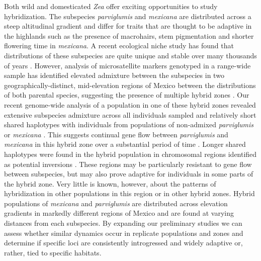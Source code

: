  	 
Both wild and domesticated \emph{Zea} offer exciting opportunities to study hybridization. 
The subspecies \emph{parviglumis} and \emph{mexicana} are distributed across a steep altitudinal gradient and differ for traits that are thought to be adaptive in the highlands such as the presence of macrohairs, stem pigmentation and shorter flowering time in \emph{mexicana}.
A recent ecological niche study has found that distributions of these subspecies are quite unique and stable over many thousands of years \citep{hufford2012inferences}.
However, analysis of microsatellite markers genotyped in a range-wide sample has identified elevated admixture between the subspecies in two geographically-distinct, mid-elevation regions of Mexico between the distributions of both parental species, suggesting the presence of multiple hybrid zones \citep{Fukunaga2005}.  
Our recent genome-wide analysis of a population in one of these hybrid zones revealed extensive subspecies admixture across all individuals sampled and relatively short shared haplotypes with individuals from populations of non-admixed \emph{parviglumis} or \emph{mexicana} \citep{Pyhajarvi2013}.
This suggests continual gene flow between \emph{parviglumis} and \emph{mexicana} in this hybrid zone over a substantial period of time \citep{Pyhajarvi2013}.  
Longer shared haplotypes were found in the hybrid population in chromosomal regions identified as potential inversions \citep{Pyhajarvi2013}.  
These regions may be particularly resistant to gene flow between subspecies, but may also prove adaptive for individuals in some parts of the hybrid zone.
Very little is known, however, about the patterns of hybridization in other populations in this region or in other hybrid zones.
Hybrid populations of \emph{mexicana} and \emph{parviglumis} are distributed across elevation gradients in markedly different regions of Mexico and are found at varying distances from each subspecies.
By expanding our preliminary studies we can assess whether similar dynamics occur in replicate populations and zones and determine if specific loci are consistently introgressed and widely adaptive or, rather, tied to specific habitats.

